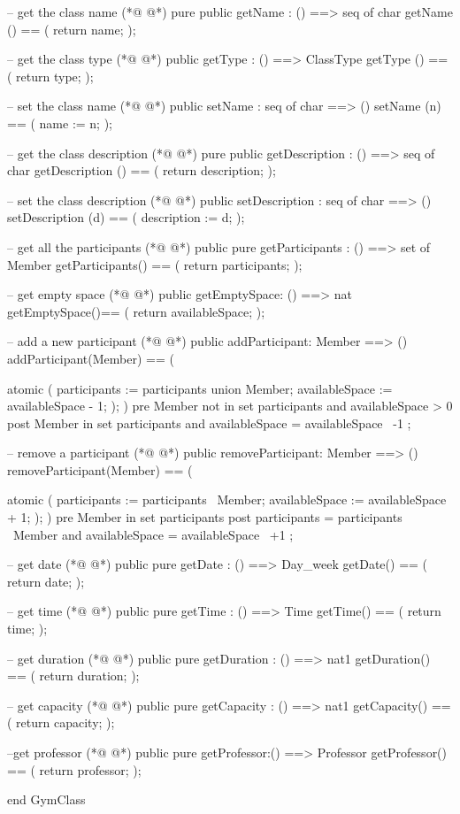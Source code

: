 \begin{vdmpp}[breaklines=true]
 
 -- get the class name
(*@
\label{getName:82}
@*)
  pure public getName : () ==> seq of char 
  getName () == (
   return name;
  );
  
  -- get the class type
(*@
\label{getType:88}
@*)
  public getType : () ==> ClassType
  getType () == (
   return type;
  );
   
 -- set the class name
(*@
\label{setName:94}
@*)
  public setName :  seq of char ==> ()
  setName (n) == (
   name := n;
  );
   
  -- get the class description
(*@
\label{getDescription:100}
@*)
  pure public getDescription : () ==>  seq of char
  getDescription () == (
   return description;
  );
   
  -- set the class description
(*@
\label{setDescription:106}
@*)
 public setDescription :  seq of char ==> ()
 setDescription (d) == (
  description := d;
 );
 
 -- get all the participants 
(*@
\label{getParticipants:112}
@*)
 public pure getParticipants : () ==> set of Member
 getParticipants() == (
  return participants;
 );
 
 -- get empty space
(*@
\label{getEmptySpace:118}
@*)
 public getEmptySpace: () ==> nat
 getEmptySpace()== (
  return availableSpace;
 ); 
  
 -- add a new participant
(*@
\label{addParticipant:124}
@*)
 public addParticipant: Member ==> ()
 addParticipant(Member) == (
  
  atomic (
   participants := participants union {Member};
   availableSpace := availableSpace - 1;
   );
 )
 pre Member not in set participants and availableSpace > 0
 post Member in set participants and availableSpace = availableSpace~ -1 ; 
 
 
 -- remove a participant
(*@
\label{removeParticipant:137}
@*)
 public removeParticipant: Member ==> ()
 removeParticipant(Member) == (
  
  atomic (
   participants := participants \ {Member};
   availableSpace := availableSpace + 1;
  );
 )
 pre Member in set participants 
 post participants = participants~ \ {Member}  and availableSpace = availableSpace~ +1 ;  
 
 
 -- get date
(*@
\label{getDate:150}
@*)
 public pure getDate : () ==> Day_week
 getDate() == (
  return date;
 );
 
 -- get time
(*@
\label{getTime:156}
@*)
 public pure getTime : () ==> Time
 getTime() == (
  return time;
 );
 
 -- get duration
(*@
\label{getDuration:162}
@*)
 public pure getDuration : () ==> nat1
 getDuration() == (
  return duration;
 );
   
 -- get capacity
(*@
\label{getCapacity:168}
@*)
 public pure getCapacity : () ==> nat1
 getCapacity() == (
  return capacity;
 );
 
 --get professor
(*@
\label{getProfessor:174}
@*)
 public pure getProfessor:() ==> Professor
 getProfessor() == (
  return professor;
 );
     
end GymClass
\end{vdmpp}
